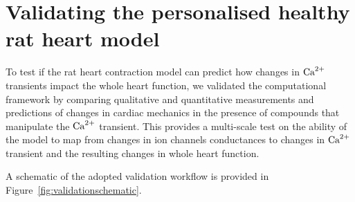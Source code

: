 %
%
%
\section{Validating the personalised healthy rat heart model}\label{sec:ch6validating_the_personalised_healthy_rat_heart_model}
To test if the rat heart contraction model can predict how changes in $\textrm{Ca}^{2+}$ transients impact the whole heart function, we validated the computational framework by comparing qualitative and quantitative measurements and predictions of changes in cardiac mechanics in the presence of compounds that manipulate the $\textrm{Ca}^{2+}$ transient. This provides a multi-scale test on the ability of the model to map from changes in ion channels conductances to changes in $\textrm{Ca}^{2+}$ transient and the resulting changes in whole heart function.

\vspace{0.2cm}\noindent
A schematic of the adopted validation workflow is provided in Figure~\ref{fig:validationschematic}.

